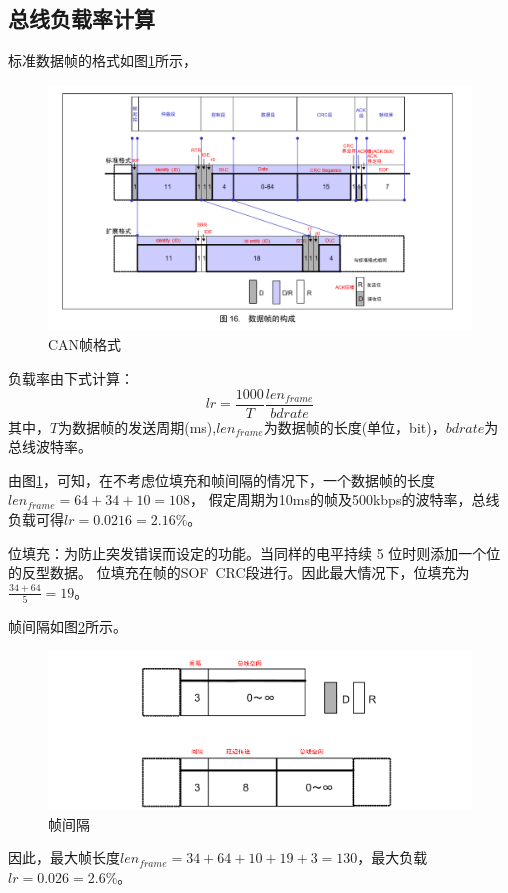 \subsection{总线负载率计算}
标准数据帧的格式如图\ref{fig:can_frame}所示，
\begin{figure}[ht]
    \centering
    \includegraphics[scale=0.7]{pic/can_frame.png}
    \caption{CAN帧格式}
    \label{fig:can_frame}
\end{figure}

负载率由下式计算\cite{url_can_load_rate}：
$$lr = \frac{1000}{T} \frac{len_{frame}}{bdrate} $$
其中，$T$为数据帧的发送周期(ms),$len_{frame}$为数据帧的长度(单位，bit)，$bdrate$为总线波特率。

由图\ref{fig:can_frame}，可知，在不考虑位填充和帧间隔的情况下，一个数据帧的长度$len_{frame}=64+34+10=108$，
假定周期为10ms的帧及500kbps的波特率，总线负载可得$lr=0.0216=2.16\%$。

位填充：为防止突发错误而设定的功能。当同样的电平持续 5 位时则添加一个位的反型数据。 
位填充在帧的SOF~CRC段进行。因此最大情况下，位填充为$\frac{34+64}{5}=19$。

帧间隔如图\ref{fig:frame_jiange}所示。
\begin{figure}[ht]
    \centering
    \includegraphics[scale=0.8]{pic/frame_jiange.png}
    \caption{帧间隔}
    \label{fig:frame_jiange}
\end{figure}
因此，最大帧长度$len_{frame}=34+64+10+19+3=130$，最大负载$lr=0.026=2.6\%$。



